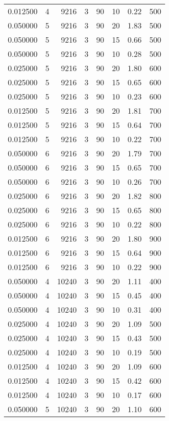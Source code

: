 \documentclass[12pt,letterpaper]{article}
\begin{document}
\begin{center}
\begin{longtable}{r|r|r|r|r|r|r|r}
0.012500 & 4 & 9216 & 3 & 90 & 10 & 0.22 & 500 \\
0.050000 & 5 & 9216 & 3 & 90 & 20 & 1.83 & 500 \\
0.050000 & 5 & 9216 & 3 & 90 & 15 & 0.66 & 500 \\
0.050000 & 5 & 9216 & 3 & 90 & 10 & 0.28 & 500 \\
0.025000 & 5 & 9216 & 3 & 90 & 20 & 1.80 & 600 \\
0.025000 & 5 & 9216 & 3 & 90 & 15 & 0.65 & 600 \\
0.025000 & 5 & 9216 & 3 & 90 & 10 & 0.23 & 600 \\
0.012500 & 5 & 9216 & 3 & 90 & 20 & 1.81 & 700 \\
0.012500 & 5 & 9216 & 3 & 90 & 15 & 0.64 & 700 \\
0.012500 & 5 & 9216 & 3 & 90 & 10 & 0.22 & 700 \\
0.050000 & 6 & 9216 & 3 & 90 & 20 & 1.79 & 700 \\
0.050000 & 6 & 9216 & 3 & 90 & 15 & 0.65 & 700 \\
0.050000 & 6 & 9216 & 3 & 90 & 10 & 0.26 & 700 \\
0.025000 & 6 & 9216 & 3 & 90 & 20 & 1.82 & 800 \\
0.025000 & 6 & 9216 & 3 & 90 & 15 & 0.65 & 800 \\
0.025000 & 6 & 9216 & 3 & 90 & 10 & 0.22 & 800 \\
0.012500 & 6 & 9216 & 3 & 90 & 20 & 1.80 & 900 \\
0.012500 & 6 & 9216 & 3 & 90 & 15 & 0.64 & 900 \\
0.012500 & 6 & 9216 & 3 & 90 & 10 & 0.22 & 900 \\
0.050000 & 4 & 10240 & 3 & 90 & 20 & 1.11 & 400 \\
0.050000 & 4 & 10240 & 3 & 90 & 15 & 0.45 & 400 \\
0.050000 & 4 & 10240 & 3 & 90 & 10 & 0.31 & 400 \\
0.025000 & 4 & 10240 & 3 & 90 & 20 & 1.09 & 500 \\
0.025000 & 4 & 10240 & 3 & 90 & 15 & 0.43 & 500 \\
0.025000 & 4 & 10240 & 3 & 90 & 10 & 0.19 & 500 \\
0.012500 & 4 & 10240 & 3 & 90 & 20 & 1.09 & 600 \\
0.012500 & 4 & 10240 & 3 & 90 & 15 & 0.42 & 600 \\
0.012500 & 4 & 10240 & 3 & 90 & 10 & 0.17 & 600 \\
0.050000 & 5 & 10240 & 3 & 90 & 20 & 1.10 & 600 \\

\end{longtable}
\end{center}
\end{document}
